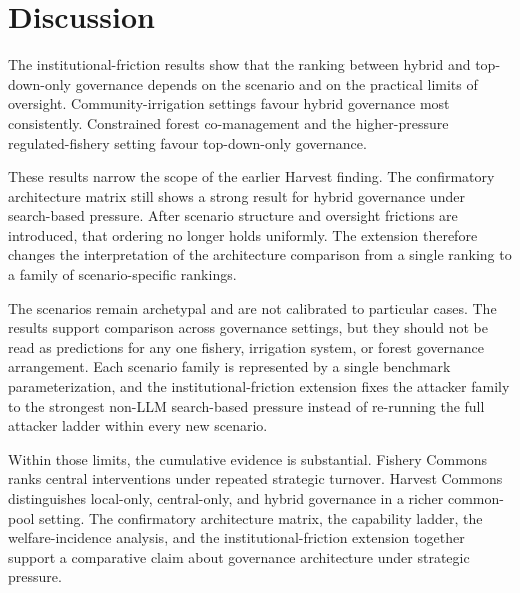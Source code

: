 \section{Discussion}

The institutional-friction results show that the ranking between hybrid and top-down-only governance depends on the scenario and on the practical limits of oversight. Community-irrigation settings favour hybrid governance most consistently. Constrained forest co-management and the higher-pressure regulated-fishery setting favour top-down-only governance.

These results narrow the scope of the earlier Harvest finding. The confirmatory architecture matrix still shows a strong result for hybrid governance under search-based pressure. After scenario structure and oversight frictions are introduced, that ordering no longer holds uniformly. The extension therefore changes the interpretation of the architecture comparison from a single ranking to a family of scenario-specific rankings.

The scenarios remain archetypal and are not calibrated to particular cases. The results support comparison across governance settings, but they should not be read as predictions for any one fishery, irrigation system, or forest governance arrangement. Each scenario family is represented by a single benchmark parameterization, and the institutional-friction extension fixes the attacker family to the strongest non-LLM search-based pressure instead of re-running the full attacker ladder within every new scenario.

Within those limits, the cumulative evidence is substantial. Fishery Commons ranks central interventions under repeated strategic turnover. Harvest Commons distinguishes local-only, central-only, and hybrid governance in a richer common-pool setting. The confirmatory architecture matrix, the capability ladder, the welfare-incidence analysis, and the institutional-friction extension together support a comparative claim about governance architecture under strategic pressure.
